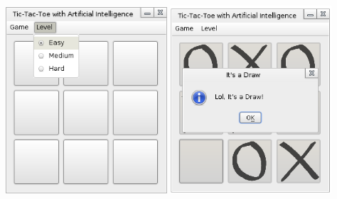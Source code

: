 \begin{center}
\includegraphics[width=0.45\textwidth]{./game4}
\hspace*{0.1em}
\includegraphics[width=0.45\textwidth]{./game5}

\end{center}